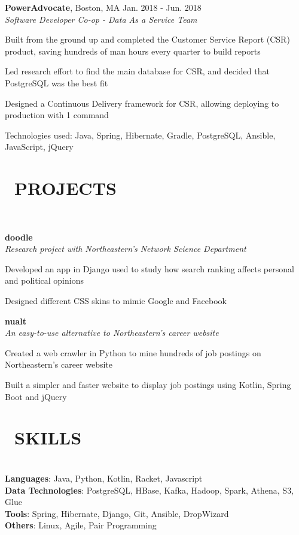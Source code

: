 \documentclass[11pt]{res}
\newcommand{\sectionunderline}{\vspace{-3mm}\hrulefill\\}
\newcommand{\listingtab}{\tabto{3.5cm}}
\newcommand{\newsect}[1]{\section{\Large \bf #1}}
\begin{document}
\begin{resume}
{{      {\bf PowerAdvocate}, Boston, MA \hfill Jan. 2018 - Jun. 2018\\
      {\it Software Developer Co-op - Data As a Service Team}
      \begin{itemize}
        {\item Built from the ground up and completed the Customer Service Report (CSR) product, saving hundreds of man hours every quarter to build reports}
        {\item Led research effort to find the main database for CSR, and decided that PostgreSQL was the best fit}
        {\item Designed a Continuous Delivery framework for CSR, allowing deploying to production with 1 command}
        {\item Technologies used: Java, Spring, Hibernate, Gradle, PostgreSQL, Ansible, JavaScript, jQuery}
      \end{itemize}
    }
  }

  \newsect{\faGithubAlt\ PROJECTS}{
    \sectionunderline{
      {\bf doodle}\\
      {\it Research project with Northeastern's Network Science Department}
      \begin{itemize}
        {\item Developed an app in Django used to study how search ranking affects personal and political opinions}
        {\item Designed different CSS skins to mimic Google and Facebook}
      \end{itemize}

      {\bf nualt}\\
      {\it An easy-to-use alternative to Northeastern's career website}
      \begin{itemize}
        {\item Created a web crawler in Python to mine hundreds of job postings on Northeastern's career website}
        {\item Built a simpler and faster website to display job postings using Kotlin, Spring Boot and jQuery}
      \end{itemize}
    }
  }

  \newsect{\faCogs\ SKILLS}{
    \sectionunderline{
      {\bf Languages}: \listingtab Java, Python, Kotlin, Racket, Javascript\\
      {\bf Data Technologies}: \listingtab PostgreSQL, HBase, Kafka, Hadoop, Spark, Athena, S3, Glue\\
      {\bf Tools}: \listingtab Spring, Hibernate, Django, Git, Ansible, DropWizard\\
      {\bf Others}: \listingtab Linux, Agile, Pair Programming
    }
  }
\end{resume}
\end{document}
